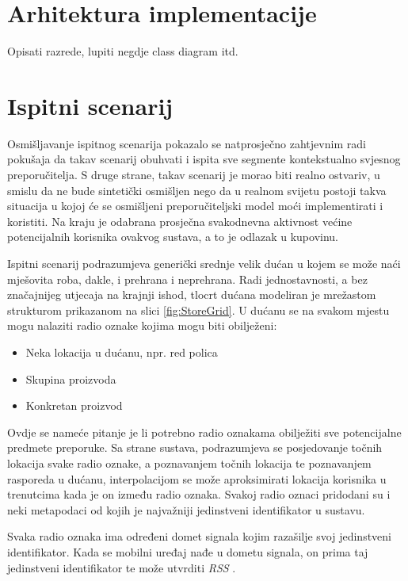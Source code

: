 \documentclass[times, utf8, diplomski, numeric]{fer}
\begin{document}
\section{Arhitektura implementacije}
Opisati razrede, lupiti negdje class diagram itd.

\section{Ispitni scenarij}
Osmišljavanje ispitnog scenarija pokazalo se natprosječno zahtjevnim radi
pokušaja da takav scenarij obuhvati i ispita sve segmente kontekstualno svjesnog
preporučitelja. S druge strane, takav scenarij je morao biti realno
ostvariv, u smislu da ne bude sintetički osmišljen nego da u realnom
svijetu postoji takva situacija u kojoj će se osmišljeni preporučiteljski
model moći implementirati i koristiti. Na kraju je odabrana prosječna
svakodnevna aktivnost većine potencijalnih korisnika ovakvog sustava, a to je
odlazak u kupovinu.

Ispitni scenarij podrazumjeva generički srednje velik dućan u kojem se
može naći mješovita roba, dakle, i prehrana i neprehrana. Radi jednostavnosti, a
bez značajnijeg utjecaja na krajnji ishod, tlocrt dućana modeliran je mrežastom
strukturom prikazanom na slici \ref{fig:StoreGrid}. U dućanu se na svakom mjestu
mogu nalaziti radio oznake  kojima mogu biti obilježeni:
\begin{itemize}
  \item Neka lokacija u dućanu, npr. red polica
  \item Skupina proizvoda
  \item Konkretan proizvod
\end{itemize}
Ovdje se nameće pitanje je li potrebno radio oznakama obilježiti sve
potencijalne predmete preporuke. Sa strane sustava, podrazumjeva se
posjedovanje točnih lokacija svake radio oznake, a poznavanjem točnih lokacija
te poznavanjem rasporeda u dućanu, interpolacijom se može aproksimirati lokacija
korisnika u trenutcima kada je on između radio oznaka. Svakoj radio oznaci
pridodani su i neki metapodaci od kojih je najvažniji jedinstveni identifikator
u sustavu.

Svaka radio oznaka ima određeni domet signala kojim razašilje 
svoj jedinstveni identifikator. Kada se mobilni uređaj nađe u dometu signala, on
prima taj jedinstveni identifikator te može utvrditi \emph{RSS} . 
\end{document}
